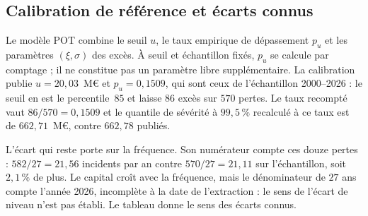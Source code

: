 \subsection{Calibration de référence et écarts connus}
\label{sec:pu-coherence}

Le modèle POT combine le seuil $u$, le taux empirique de dépassement $p_u$ et les paramètres $(\xi,\sigma)$ des excès. À seuil et échantillon fixés, $p_u$ se calcule par comptage ; il ne constitue pas un paramètre libre supplémentaire. La
calibration publie $u=20{,}03$~M\euro{} et $p_u=0{,}1509$, qui sont ceux de l'échantillon 2000--2026 : le seuil en est le percentile~$85$ et laisse $86$ excès sur $570$ pertes. Le taux recompté vaut $86/570=0{,}1509$ et le quantile de sévérité à $99{,}5\,\%$ recalculé à ce taux est de $662{,}71$~M\euro, contre $662{,}78$ publiés.

L'écart qui reste porte sur la fréquence. Son numérateur compte ces douze pertes : $582/27=21{,}56$ incidents par an contre $570/27=21{,}11$ sur l'échantillon, soit $2{,}1\,\%$ de plus. Le capital croît avec la fréquence, mais le dénominateur de $27$ ans compte l'année 2026, incomplète à la date de l'extraction : le sens de l'écart de niveau n'est pas établi. Le tableau
donne le sens des écarts connus.

